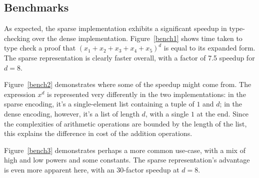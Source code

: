 \documentclass[draft, twocolumn]{article}
\theoremstyle{definition}
\theoremstyle{definition}
\begin{document}
\subsection{Benchmarks}
As expected, the sparse implementation exhibits a significant speedup in
type-checking over the dense implementation\footnotemark. Figure~\ref{bench1}
shows time taken to type check a proof that \((x_1 + x_2 + x_3 + x_4 + x_5)^d\)
is equal to its expanded form. The sparse representation is clearly faster
overall, with a factor of 7.5 speedup for \(d = 8\).

Figure~\ref{bench2} demonstrates where some of the speedup might come
from. The expression \(x^d\) is represented very differently in the two
implementations: in the sparse encoding, it's a single-element list containing a
tuple of $1$ and $d$; in the dense encoding, however, it's a list of length $d$,
with a single $1$ at the end. Since the complexities of arithmetic operations
are bounded by the length of the list, this explains the difference in cost of
the addition operations.

Figure~\ref{bench3} demonstrates perhaps a more common use-case, with a mix of
high and low powers and some constants. The sparse representation's advantage is
even more apparent here, with an \(30\)-factor speedup at \(d = 8\).
\end{document}
